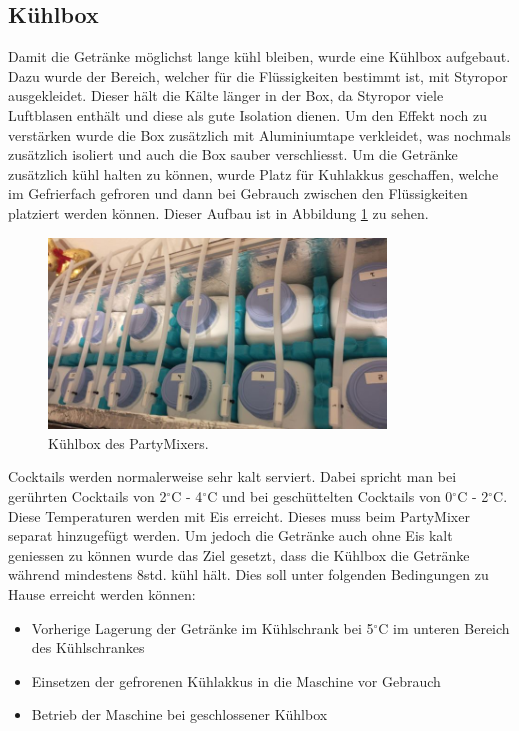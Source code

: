 \subsection{Kühlbox}
\label{subsec:Kuehlbox}

Damit die Getränke möglichst lange kühl bleiben, wurde eine Kühlbox aufgebaut. Dazu wurde der Bereich, welcher für die Flüssigkeiten bestimmt ist, mit Styropor ausgekleidet. Dieser hält die Kälte länger in der Box, da Styropor viele Luftblasen enthält und diese als gute Isolation dienen. Um den Effekt noch zu verstärken wurde die Box zusätzlich mit Aluminiumtape verkleidet, was nochmals zusätzlich isoliert und auch die Box sauber verschliesst. Um die Getränke zusätzlich kühl halten zu können, wurde Platz für Kuhlakkus geschaffen, welche im Gefrierfach gefroren und dann bei Gebrauch zwischen den Flüssigkeiten platziert werden können. Dieser Aufbau ist in Abbildung \ref{fig:Kuehlbox} zu sehen.

\begin{figure}[H]
	\centering
	\includegraphics [width=0.8\textwidth]{graphics/Kuehlbox}
	\caption{Kühlbox des PartyMixers.}
	\label{fig:Kuehlbox}
\end{figure} 

Cocktails werden normalerweise sehr kalt serviert. Dabei spricht man bei gerührten Cocktails von 2$^\circ$C - 4$^\circ$C und bei geschüttelten Cocktails von 0$^\circ$C - 2$^\circ$C. Diese Temperaturen werden mit Eis erreicht. Dieses muss beim PartyMixer separat hinzugefügt werden. Um jedoch die Getränke auch ohne Eis kalt geniessen zu können wurde das Ziel gesetzt, dass die Kühlbox die Getränke während mindestens 8std. kühl hält. Dies soll unter folgenden Bedingungen zu Hause erreicht werden können: \cite{mangomix_cocktail_2020}

\begin{itemize}
\item Vorherige Lagerung der Getränke im Kühlschrank bei 5$^\circ$C im unteren Bereich des Kühlschrankes
\item Einsetzen der gefrorenen Kühlakkus in die Maschine vor Gebrauch 
\item Betrieb der Maschine bei geschlossener Kühlbox
\end{itemize}


